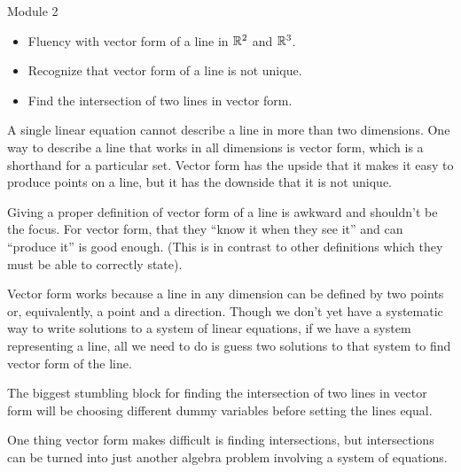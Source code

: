 \documentclass{workbook}
\begin{document}
\begin{lesson}

	Module 2

	\begin{itemize}
		\item Fluency with vector form of a line in $\mathbb{R}^2$ and $\mathbb{R}^3$.
		\item Recognize that vector form of a line is not unique.
		\item Find the intersection of two lines in vector form.
	\end{itemize}

	A single linear equation cannot describe a line in more than two dimensions.
	One way to describe a line that works in all dimensions is vector form, which
	is a shorthand for a particular set. Vector form has the upside that it makes it easy
	to produce points on a line, but it has the downside that it is not unique.

	\begin{annotation}
		\begin{notes}
			Giving a proper definition of vector form of a line is awkward and
			shouldn't be the focus. For vector form, that they ``know it when they see it''
			and can ``produce it'' is good enough. (This is in contrast to other definitions
			which they must be able to correctly state).
		\end{notes}
	\end{annotation}
	Vector form works because a line in any dimension can be defined by two
	points or, equivalently, a point and a direction. Though we don't yet have
	a systematic way to write solutions to a system of linear equations,
	if we have a system representing a line, all we need to do is guess two
	solutions to that system to find vector form of the line.


	\begin{annotation}
		\begin{notes}
			The biggest stumbling block for finding the intersection of two lines
			in vector form will be choosing different dummy variables before
			setting the lines equal.
		\end{notes}
	\end{annotation}
	One thing vector form makes difficult is finding intersections, but intersections
	can be turned into just another algebra problem involving a system of equations.

\end{lesson}
\end{document}
